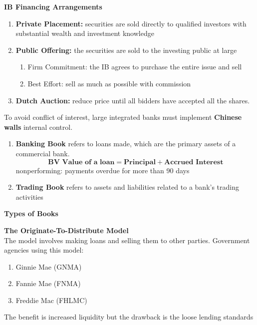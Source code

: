 \documentclass[11pt,fleqn]{report} %
\numberwithin{equation}{section} %
\numberwithin{figure}{section} %
\numberwithin{table}{section} %
\begin{document}
\begin{definition}\textbf{IB Financing Arrangements}
\begin{enumerate}
    \item \textbf{Private Placement:} securities are sold directly to qualified investors with substantial wealth and investment knowledge
    \item \textbf{Public Offering:} the securities are sold to the investing public at large
    \begin{enumerate}
        \item Firm Commitment: the IB agrees to purchase the entire issue and sell
        \item Best Effort: sell as much as possible with commission
    \end{enumerate}
    \item \textbf{Dutch Auction:} reduce price until all bidders have accepted all the shares.
\end{enumerate}
\end{definition}
\begin{remark}
To avoid conflict of interest, large integrated banks must implement \textbf{Chinese walls} internal control.
\end{remark}
\begin{definition}
\begin{enumerate}
    \item \textbf{Banking Book} refers to loans made, which are the primary assets of a commercial bank.
    $$
    \textbf{BV Value of a loan}=\textbf{Principal}+\textbf{Accrued Interest}
    $$
    nonperforming: payments overdue for more than 90 days
    \item \textbf{Trading Book} refers to assets and liabilities related to a bank's trading activities
\end{enumerate}
\end{definition}\textbf{Types of Books}

\begin{definition}\textbf{The Originate-To-Distribute Model}\\
The model involves making loans and selling them to other parties. Government agencies using this model:
\begin{enumerate}
    \item Ginnie Mae (GNMA)
    \item Fannie Mae (FNMA)
    \item Freddie Mac (FHLMC)
\end{enumerate}
The benefit is increased liquidity but the drawback is the loose lending standards
\end{definition}
\end{document}
